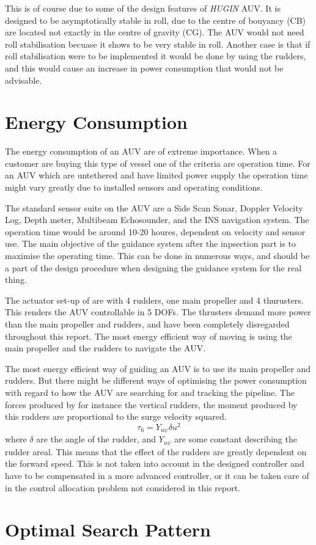 	This is of course due to some of the design features of \textit{HUGIN} AUV. It is designed to be
	asymptotically stable in roll, due to the centre of bouyancy (CB) are located not exactly in the centre of
	gravity (CG). The AUV would not need roll stabilisation becuase it shows to be very stable in roll.
	Another case is that if roll stabilisation were to be implemented it would be done by using the
	rudders, and this would cause an increase in power consumption that would not be advisable. 


\section{Energy Consumption}
	The energy consumption of an AUV are of extreme importance. When a customer are buying this type of
	vessel one of the criteria are operation time. For an AUV which are untethered and have limited power 
	supply the operation time might vary greatly due to installed sensors and operating conditions.

	The standard sensor suite on the \hugin AUV are a Side Scan Sonar, Doppler Velocity Log, Depth meter,
	Multibeam Echosounder, and the INS navigation system. The operation time would be around 10-20 houres,
	dependent on velocity and sensor use. The main objective of the guidance system after the inpsection
	part is to maximise the operating time. This can be done in numerous ways, and should be a part of the
	design procedure when designing the guidance system for the real thing.

	The actuator set-up of \hugin  are with 4 rudders, one main propeller and 4 thurusters. This renders
	the AUV controllable in 5 DOFs. The thrusters demand more power than the main propeller
	and rudders, and have been completely disregarded throughout this report. The most energy efficient
	way of moving is using the main propeller and the rudders to navigate the AUV.

	The most energy efficient way of guiding an AUV is to use its main propeller and rudders. But there
	might be different ways of optimising the power consumption with regard to how the AUV are searching
	for and tracking the pipeline. The forces produced by for instance the vertical rudders, the moment
	produced by this rudders are proportional to the surge velocity squared.
		\begin{equation}
			\tau_6 = Y_{u\psi} \delta u^2
		\end{equation}
	where $\delta$ are the angle of the rudder, and $Y_{u \psi}$ are some constant describing the rudder
	areal. This means that the effect of the rudders are greatly dependent on the forward speed. This is
	not taken into account in the designed controller and have to be compensated in a more advanced
	controller, or it can be taken care of in the control allocation problem not considered in this
	report.  
	
	


\section{Optimal Search Pattern}




